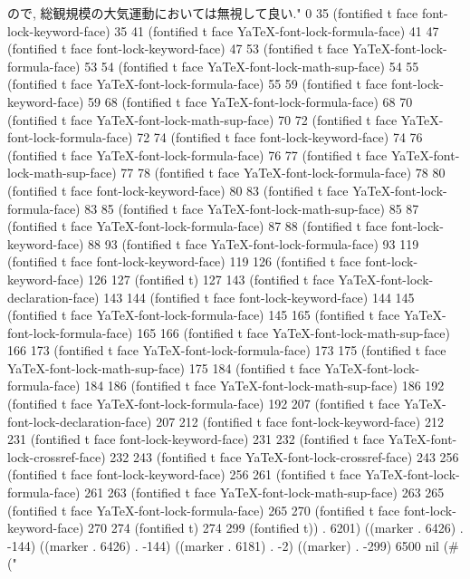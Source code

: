 	   ので, 総観規模の大気運動においては無視して良い." 0 35 (fontified t face font-lock-keyword-face) 35 41 (fontified t face YaTeX-font-lock-formula-face) 41 47 (fontified t face font-lock-keyword-face) 47 53 (fontified t face YaTeX-font-lock-formula-face) 53 54 (fontified t face YaTeX-font-lock-math-sup-face) 54 55 (fontified t face YaTeX-font-lock-formula-face) 55 59 (fontified t face font-lock-keyword-face) 59 68 (fontified t face YaTeX-font-lock-formula-face) 68 70 (fontified t face YaTeX-font-lock-math-sup-face) 70 72 (fontified t face YaTeX-font-lock-formula-face) 72 74 (fontified t face font-lock-keyword-face) 74 76 (fontified t face YaTeX-font-lock-formula-face) 76 77 (fontified t face YaTeX-font-lock-math-sup-face) 77 78 (fontified t face YaTeX-font-lock-formula-face) 78 80 (fontified t face font-lock-keyword-face) 80 83 (fontified t face YaTeX-font-lock-formula-face) 83 85 (fontified t face YaTeX-font-lock-math-sup-face) 85 87 (fontified t face YaTeX-font-lock-formula-face) 87 88 (fontified t face font-lock-keyword-face) 88 93 (fontified t face YaTeX-font-lock-formula-face) 93 119 (fontified t face font-lock-keyword-face) 119 126 (fontified t face font-lock-keyword-face) 126 127 (fontified t) 127 143 (fontified t face YaTeX-font-lock-declaration-face) 143 144 (fontified t face font-lock-keyword-face) 144 145 (fontified t face YaTeX-font-lock-formula-face) 145 165 (fontified t face YaTeX-font-lock-formula-face) 165 166 (fontified t face YaTeX-font-lock-math-sup-face) 166 173 (fontified t face YaTeX-font-lock-formula-face) 173 175 (fontified t face YaTeX-font-lock-math-sup-face) 175 184 (fontified t face YaTeX-font-lock-formula-face) 184 186 (fontified t face YaTeX-font-lock-math-sup-face) 186 192 (fontified t face YaTeX-font-lock-formula-face) 192 207 (fontified t face YaTeX-font-lock-declaration-face) 207 212 (fontified t face font-lock-keyword-face) 212 231 (fontified t face font-lock-keyword-face) 231 232 (fontified t face YaTeX-font-lock-crossref-face) 232 243 (fontified t face YaTeX-font-lock-crossref-face) 243 256 (fontified t face font-lock-keyword-face) 256 261 (fontified t face YaTeX-font-lock-formula-face) 261 263 (fontified t face YaTeX-font-lock-math-sup-face) 263 265 (fontified t face YaTeX-font-lock-formula-face) 265 270 (fontified t face font-lock-keyword-face) 270 274 (fontified t) 274 299 (fontified t)) . 6201) ((marker . 6426) . -144) ((marker . 6426) . -144) ((marker . 6181) . -2) ((marker) . -299) 6500 nil (#("
